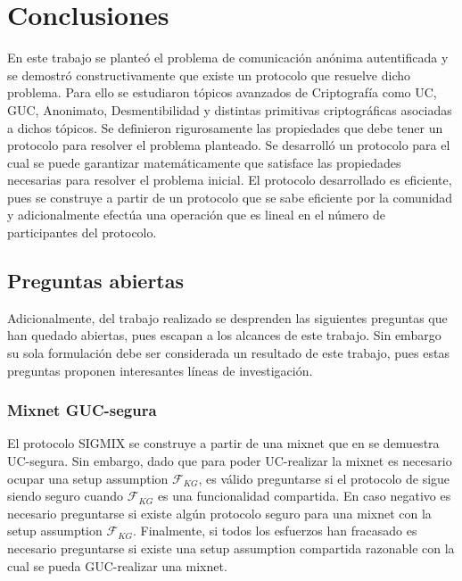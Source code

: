 \chapter{Conclusiones}

En este trabajo se planteó el problema de comunicación anónima autentificada y se
demostró constructivamente que existe un protocolo que resuelve dicho problema.
Para ello se estudiaron tópicos avanzados de Criptografía como UC, GUC, Anonimato,
Desmentibilidad y distintas primitivas criptográficas asociadas a dichos tópicos.
Se definieron rigurosamente las propiedades que debe tener un protocolo para
resolver el problema planteado.
Se desarrolló un protocolo para el cual se puede garantizar matemáticamente que
satisface las propiedades necesarias para resolver el problema inicial.
El protocolo desarrollado es eficiente, pues se construye a partir de un protocolo
que se sabe eficiente por la comunidad \cite{Wikstrom04a} y adicionalmente efectúa
una operación que es lineal en el número de participantes del protocolo.\\

\section{Preguntas abiertas}

Adicionalmente, del trabajo realizado se desprenden las siguientes preguntas que han
quedado abiertas, pues escapan a los alcances de este trabajo. Sin embargo 
su sola formulación debe ser considerada un resultado de este trabajo, pues
estas preguntas proponen interesantes líneas de investigación.

\subsection{Mixnet GUC-segura}
El protocolo SIGMIX se construye a partir de una mixnet que en \cite{Wikstrom04a}
se demuestra UC-segura. Sin embargo, dado que para poder UC-realizar la mixnet
es necesario ocupar una setup assumption $\mathcal{F}_{KG}$, es válido preguntarse
si el protocolo de \cite{Wikstrom04a} sigue siendo seguro cuando $\mathcal{F}_{KG}$
es una funcionalidad compartida. En caso negativo es necesario preguntarse si existe
algún protocolo seguro para una mixnet con la setup assumption $\mathcal{F}_{KG}$.
Finalmente, si todos los esfuerzos han fracasado es necesario preguntarse si existe
una setup assumption compartida razonable con la cual se pueda GUC-realizar una
mixnet.\\

